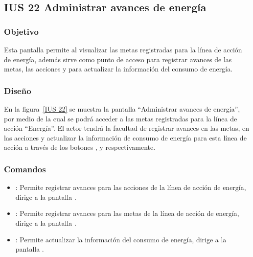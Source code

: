 \subsection{IUS 22 Administrar avances de energía}

\subsubsection{Objetivo}

    Esta pantalla permite al  visualizar las metas registradas para la línea de acción de energía, además sirve como punto de acceso para registrar avances de las metas, las acciones y para actualizar la información del consumo de energía. 
    
\subsubsection{Diseño}

        En la figura~\ref{IUS 22} se muestra la pantalla ``Administrar avances de energía'', por medio de la cual se podrá acceder a las metas registradas para la línea de acción ``Energía''. El actor tendrá la facultad de registrar avances en las metas, en las acciones y actualizar la información de consumo de energía para esta línea de acción a través de los botones \botAcciones, \botMetas y  respectivamente.  




\subsubsection{Comandos}
    \begin{itemize}	
	\item {}: Permite registrar avances para las acciones de la línea de acción de energía, dirige a la pantalla .
	\item {}: Permite registrar avances para las metas de la línea de acción de energía, dirige a la pantalla .	
	\item {}: Permite actualizar la información del consumo de energía, dirige a la pantalla .
    \end{itemize}

